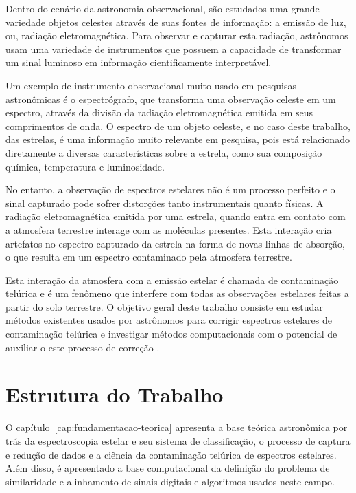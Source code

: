 Dentro do cenário da astronomia observacional, são estudados uma grande variedade objetos celestes através de suas fontes de informação: a emissão de luz, ou, radiação eletromagnética. Para observar e capturar esta radiação, astrônomos usam uma variedade de instrumentos que possuem a capacidade de transformar um sinal luminoso em informação cientificamente interpretável.

Um exemplo de instrumento observacional muito usado em pesquisas astronômicas é o espectrógrafo, que transforma uma observação celeste em um espectro, através da divisão da radiação eletromagnética emitida em seus comprimentos de onda. O espectro de um objeto celeste, e no caso deste trabalho, das estrelas, é uma informação muito relevante em pesquisa, pois está relacionado diretamente a diversas características sobre a estrela, como sua composição química, temperatura e luminosidade.

No entanto, a observação de espectros estelares não é um processo perfeito e o sinal capturado pode sofrer distorções tanto instrumentais quanto físicas. A radiação eletromagnética emitida por uma estrela, quando entra em contato com a atmosfera terrestre interage com as moléculas presentes. Esta interação cria artefatos no espectro capturado da estrela na forma de novas linhas de absorção, o que resulta em um espectro contaminado pela atmosfera terrestre.

Esta interação da atmosfera com a emissão estelar é chamada de contaminação telúrica e é um fenômeno que interfere com todas as observações estelares feitas a partir do solo terrestre. O objetivo geral deste trabalho consiste em estudar métodos existentes usados por astrônomos para corrigir espectros estelares de contaminação telúrica e investigar métodos computacionais com o potencial de auxiliar o este processo de correção .


\section{Estrutura do Trabalho}

O capítulo~\ref{cap:fundamentacao-teorica} apresenta a base teórica astronômica por trás da espectroscopia estelar e seu sistema de classificação, o processo de captura e redução de dados e a ciência da contaminação telúrica de espectros estelares. Além disso, é apresentado a base computacional da definição do problema de similaridade e alinhamento de sinais digitais e algoritmos usados neste campo.

